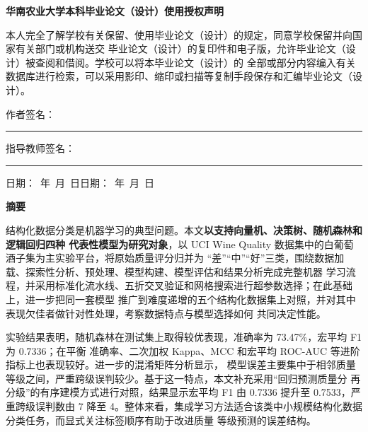 \documentclass[12pt,a4paper,fontset=fandol]{ctexart}
\numberwithin{figure}{section}
\numberwithin{table}{section}
\numberwithin{equation}{section}
\begin{document}
\begin{center}{\large\bfseries 华南农业大学本科毕业论文（设计）使用授权声明}\end{center}
\vspace{0.5em}
\par 本人完全了解学校有关保留、使用毕业论文（设计）的规定，同意学校保留并向国家有关部门或机构送交
毕业论文（设计）的复印件和电子版，允许毕业论文（设计）被查阅和借阅。学校可以将本毕业论文（设计）的
全部或部分内容编入有关数据库进行检索，可以采用影印、缩印或扫描等复制手段保存和汇编毕业论文（设计）。
\vspace{1.2cm}
\par\hfill 作者签名：\rule{3cm}{0.4pt}\qquad 指导教师签名：\rule{3cm}{0.4pt}\hspace{1cm}
\par\hfill 日期：\quad\ 年\ \quad 月\ \quad 日\qquad\quad 日期：\quad\ 年\ \quad 月\ \quad 日\hspace{1cm}
\newpage
{}   %
\setcounter{page}{1}

\begin{center}{\Large\bfseries 摘\quad 要}\end{center}
\par 结构化数据分类是机器学习的典型问题。本文\textbf{以支持向量机、决策树、随机森林和逻辑回归四种
代表性模型为研究对象}，以 UCI Wine Quality 数据集中的白葡萄酒子集为主实验平台，将原始质量评分归并为
“差”“中”“好”三类，围绕数据加载、探索性分析、预处理、模型构建、模型评估和结果分析完成完整机器
学习流程，并采用标准化流水线、五折交叉验证和网格搜索进行超参数选择；在此基础上，进一步把同一套模型
推广到难度递增的五个结构化数据集上对照，并对其中表现欠佳者做针对性处理，考察数据特点与模型选择如何
共同决定性能。

\par 实验结果表明，随机森林在测试集上取得较优表现，准确率为 73.47\%，宏平均 F1 为 0.7336；在平衡
准确率、二次加权 Kappa、MCC 和宏平均 ROC-AUC 等进阶指标上也表现较好。进一步的混淆矩阵分析显示，
模型误差主要集中于相邻质量等级之间，严重跨级误判较少。基于这一特点，本文补充采用“回归预测质量分
再分级”的有序建模方式进行对照，结果显示宏平均 F1 由 0.7336 提升至 0.7533，严重跨级误判数由 7 降至
4。整体来看，集成学习方法适合该类中小规模结构化数据分类任务，而显式关注标签顺序有助于改进质量
等级预测的误差结构。
\end{document}
